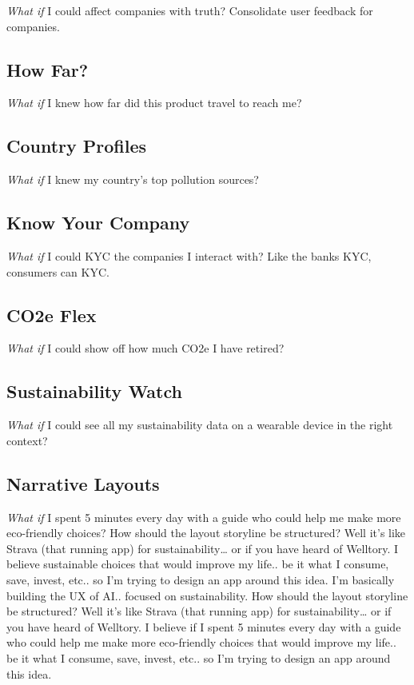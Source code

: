 \documentclass[
  letterpaper,
  DIV=11,
  numbers=noendperiod]{scrartcl}
\begin{document}
\emph{What if} I could affect companies with truth? Consolidate user
feedback for companies.

\subsection{How Far?}\label{how-far}

\emph{What if} I knew how far did this product travel to reach me?

\subsection{Country Profiles}\label{country-profiles}

\emph{What if} I knew my country's top pollution sources?

\subsection{Know Your Company}\label{know-your-company}

\emph{What if} I could KYC the companies I interact with? Like the banks
KYC, consumers can KYC.

\subsection{CO2e Flex}\label{co2e-flex}

\emph{What if} I could show off how much CO2e I have retired?

\subsection{Sustainability Watch}\label{sustainability-watch}

\emph{What if} I could see all my sustainability data on a wearable
device in the right context?

\subsection{Narrative Layouts}\label{narrative-layouts}

\emph{What if} I spent 5 minutes every day with a guide who could help
me make more eco-friendly choices? How should the layout storyline be
structured? Well it's like Strava (that running app) for
sustainability\ldots{} or if you have heard of Welltory. I believe
sustainable choices that would improve my life.. be it what I consume,
save, invest, etc.. so I'm trying to design an app around this idea. I'm
basically building the UX of AI.. focused on sustainability. How should
the layout storyline be structured? Well it's like Strava (that running
app) for sustainability\ldots{} or if you have heard of Welltory. I
believe if I spent 5 minutes every day with a guide who could help me
make more eco-friendly choices that would improve my life.. be it what I
consume, save, invest, etc.. so I'm trying to design an app around this
idea.
\end{document}
